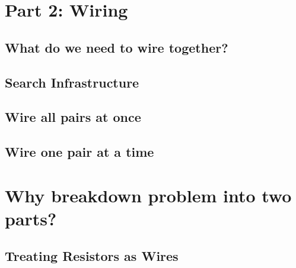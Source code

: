 \section{Part 2: Wiring}

\subsection{What do we need to wire together?}

\subsection{Search Infrastructure}

\subsection{Wire all pairs at once}

\subsection{Wire one pair at a time}

\section{Why breakdown problem into two parts?}

\subsection{Treating Resistors as Wires}
\label{sec:resistors_as_wires}

